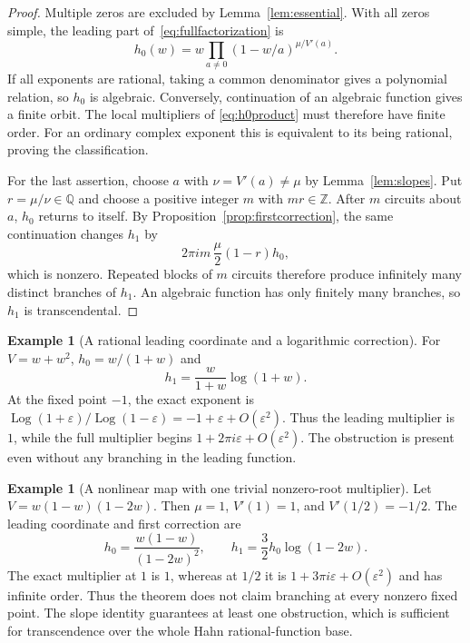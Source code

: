 \documentclass[11pt,a4paper]{article}
\numberwithin{equation}{section}
\theoremstyle{definition}
\newtheorem{example}[theorem]{Example}
\theoremstyle{remark}
\newcommand{\Q}{\mathbb Q}
\newcommand{\Z}{\mathbb Z}
\newcommand{\eps}{\varepsilon}
\newcommand{\Log}{\operatorname{Log}}
\begin{document}
\begin{proof}
Multiple zeros are excluded by Lemma~\ref{lem:essential}.  With all zeros
simple, the leading part of~\eqref{eq:fullfactorization} is
\begin{equation}\label{eq:h0product}
 h_0(w)=w\prod_{a\ne0}(1-w/a)^{\mu/V'(a)}.
\end{equation}
If all exponents are rational, taking a common denominator gives a
polynomial relation, so $h_0$ is algebraic.  Conversely, continuation of an
algebraic function gives a finite orbit.  The local multipliers of
\eqref{eq:h0product} must therefore have finite order.  For an ordinary
complex exponent this is equivalent to its being rational, proving the
classification.

For the last assertion, choose $a$ with $\nu=V'(a)\ne\mu$ by
Lemma~\ref{lem:slopes}.  Put $r=\mu/\nu\in\Q$ and choose a positive integer
$m$ with $mr\in\Z$.  After $m$ circuits about $a$, $h_0$ returns to itself.
By Proposition~\ref{prop:firstcorrection}, the same continuation changes
$h_1$ by
\[
 2\pi i m\,\frac\mu2(1-r)h_0,
\]
which is nonzero.  Repeated blocks of $m$ circuits therefore produce
infinitely many distinct branches of $h_1$.  An algebraic function has
only finitely many branches, so $h_1$ is transcendental.
\end{proof}

\begin{example}[A rational leading coordinate and a logarithmic correction]
For $V=w+w^2$, $h_0=w/(1+w)$ and
\[
 h_1=\frac{w}{1+w}\log(1+w).
\]
At the fixed point $-1$, the exact exponent is
$\Log(1+\eps)/\Log(1-\eps)=-1+\eps+O(\eps^2)$.
Thus the leading multiplier is $1$, while the full multiplier begins
$1+2\pi i\eps+O(\eps^2)$.  The obstruction is present even without any
branching in the leading function.
\end{example}

\begin{example}[A nonlinear map with one trivial nonzero-root multiplier]
Let $V=w(1-w)(1-2w)$.  Then $\mu=1$, $V'(1)=1$, and
$V'(1/2)=-1/2$.  The leading coordinate and first correction are
\[
 h_0=\frac{w(1-w)}{(1-2w)^2},\qquad
 h_1=\frac32 h_0\log(1-2w).
\]
The exact multiplier at $1$ is $1$, whereas at $1/2$ it is
$1+3\pi i\eps+O(\eps^2)$ and has infinite order.
Thus the theorem does not claim branching at every nonzero fixed point.
The slope identity guarantees at least one obstruction, which is sufficient
for transcendence over the whole Hahn rational-function base.
\end{example}
\end{document}
